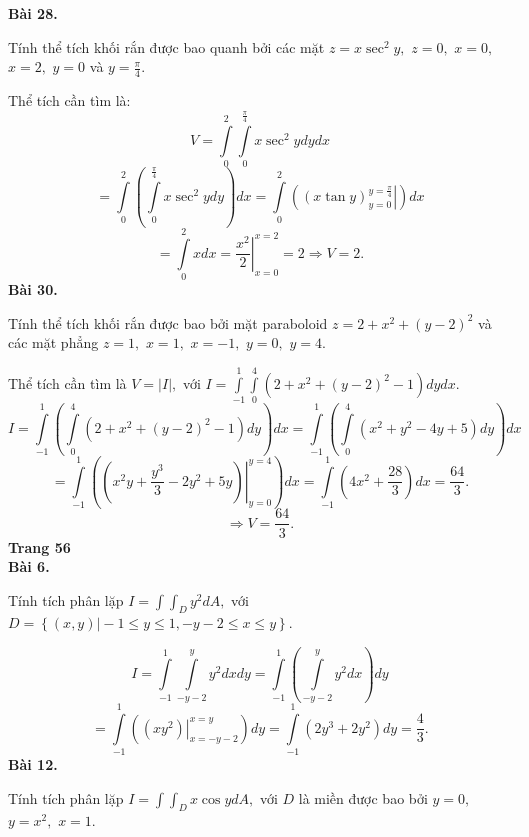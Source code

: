\documentclass[12pt,a4paper]{article}
\begin{document}
\textbf{Bài 28.} 
\begin{mybox}
Tính thể tích khối rắn được bao quanh bởi các mặt \(z = x{\sec ^2}y,\) \(z = 0,\) \(x = 0,\) \(x = 2,\) \(y = 0\) và \(y = \frac{\pi }{4}.\)
\end{mybox}
Thể tích cần tìm là:
\[V = \int\limits_0^2 {\int\limits_0^{\frac{\pi }{4}} {x{{\sec }^2}ydydx} } \]
\[ = \int\limits_0^2 {\left( {\int\limits_0^{\frac{\pi }{4}} {x{{\sec }^2}ydy} } \right)} dx = \int\limits_0^2 {\left( {\left. {\left( {x\tan y} \right)_{y = 0}^{y = \frac{\pi }{4}}} \right|} \right)} dx\]
\[ = \int\limits_0^2 {xdx}  = \left. {\frac{{{x^2}}}{2}} \right|_{x = 0}^{x = 2} = 2 \Rightarrow V = 2.\]
\textbf{Bài 30.}
\begin{mybox}
Tính thể tích khối rắn được bao bởi mặt paraboloid \(z = 2 + {x^2} + {\left( {y - 2} \right)^2}\) và các mặt phẳng \(z = 1,\) \(x = 1,\) \(x =  - 1,\) \(y = 0,\) \(y = 4.\)
\end{mybox}
Thể tích cần tìm là \(V = \left| I \right|,\) với \(I = \int\limits_{ - 1}^1 {\int\limits_0^4 {\left( {2 + {x^2} + {{\left( {y - 2} \right)}^2} - 1} \right)dydx} } .\)
\[I = \int\limits_{ - 1}^1 {\left( {\int\limits_0^4 {\left( {2 + {x^2} + {{\left( {y - 2} \right)}^2} - 1} \right)dy} } \right)dx = \int\limits_{ - 1}^1 {\left( {\int\limits_0^4 {\left( {{x^2} + {y^2} - 4y + 5} \right)dy} } \right)dx} } \]
\[ = \int\limits_{ - 1}^1 {\left( {\left. {\left( {{x^2}y + \frac{{{y^3}}}{3} - 2{y^2} + 5y} \right)} \right|_{y = 0}^{y = 4}} \right)} dx = \int\limits_{ - 1}^1 {\left( {4{x^2} + \frac{{28}}{3}} \right)} dx = \frac{{64}}{3}.\]
\[ \Rightarrow V = \frac{{64}}{3}.\]
\textbf{Trang 56}\\
\textbf{Bài 6.}
\begin{mybox}
Tính tích phân lặp \(I = \int {\int_D {{y^2}dA,} } \) với \(D = \left\{ {\left. {\left( {x,y} \right)} \right| - 1 \leqslant y \leqslant 1, - y - 2 \leqslant x \leqslant y} \right\}.\)
\end{mybox}
\[I = \int\limits_{ - 1}^1 {\int\limits_{ - y - 2}^y {{y^2}dxdy} }  = \int\limits_{ - 1}^1 {\left( {\int\limits_{ - y - 2}^y {{y^2}dx} } \right)dy} \]
\[ = \int\limits_{ - 1}^1 {\left( {\left. {\left( {x{y^2}} \right)} \right|_{x =  - y - 2}^{x = y}} \right)dy = \int\limits_{ - 1}^1 {\left( {2{y^3} + 2{y^2}} \right)dy = \frac{4}{3}} } .\]
\textbf{Bài 12.}
\begin{mybox}
Tính tích phân lặp \(I = \int {\int_D {x\cos ydA} }, \) với \(D\) là miền được bao bởi \(y = 0,\) \(y = {x^2},\) \(x = 1.\)
\end{mybox}
\end{document}
